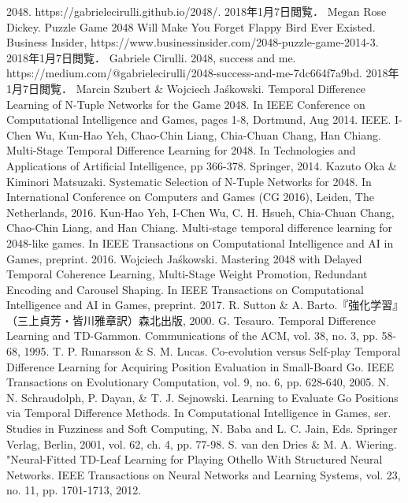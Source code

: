 \documentclass{suribt}
\begin{document}
\begin{thebibliography}{}
  2048. https://gabrielecirulli.github.io/2048/. 2018年1月7日閲覧．
  Megan Rose Dickey. Puzzle Game 2048 Will Make You Forget Flappy Bird Ever Existed. Business Insider, https://www.businessinsider.com/2048-puzzle-game-2014-3. 2018年1月7日閲覧．
  Gabriele Cirulli. 2048, success and me. https://medium.com/@gabrielecirulli/2048-success-and-me-7dc664f7a9bd. 2018年1月7日閲覧．
  Marcin Szubert \& Wojciech Ja\'{s}kowski. Temporal Difference Learning of N-Tuple Networks for the Game 2048. In IEEE Conference on Computational Intelligence and Games, pages 1-8, Dortmund, Aug 2014. IEEE.
  I-Chen Wu, Kun-Hao Yeh, Chao-Chin Liang, Chia-Chuan Chang, Han Chiang. Multi-Stage Temporal Difference Learning for 2048. In Technologies and Applications of Artificial Intelligence, pp 366-378. Springer, 2014.
  Kazuto Oka \& Kiminori Matsuzaki. Systematic Selection of N-Tuple Networks for 2048. In International Conference on Computers and Games (CG 2016), Leiden, The Netherlands, 2016.
  Kun-Hao Yeh, I-Chen Wu, C. H. Hsueh, Chia-Chuan Chang, Chao-Chin Liang, and Han Chiang. Multi-stage temporal difference learning for 2048-like games. In IEEE Transactions on Computational Intelligence and AI in Games, preprint. 2016.
  Wojciech Ja\'{s}kowski. Mastering 2048 with Delayed Temporal Coherence Learning, Multi-Stage Weight Promotion, Redundant Encoding and Carousel Shaping. In IEEE Transactions on Computational Intelligence and AI in Games, preprint. 2017.
  R. Sutton \& A. Barto.『強化学習』（三上貞芳・皆川雅章訳）森北出版, 2000.
  G. Tesauro. Temporal Difference Learning and TD-Gammon. Communications of the ACM, vol. 38, no. 3, pp. 58-68, 1995.
  T. P. Runarsson \& S. M. Lucas. Co-evolution versus Self-play Temporal Difference Learning for Acquiring Position Evaluation in Small-Board Go. IEEE Transactions on Evolutionary Computation, vol. 9, no. 6, pp. 628-640, 2005.
  N. N. Schraudolph, P. Dayan, \& T. J. Sejnowski. Learning to Evaluate Go Positions via Temporal Difference Methods. In Computational Intelligence in Games, ser. Studies in Fuzziness and Soft Computing, N. Baba and L. C. Jain, Eds. Springer Verlag, Berlin, 2001, vol. 62, ch. 4, pp. 77-98.
  S. van den Dries \& M. A. Wiering. "Neural-Fitted TD-Leaf Learning for Playing Othello With Structured Neural Networks. IEEE Transactions on Neural Networks and Learning Systems, vol. 23, no. 11, pp. 1701-1713, 2012.

\end{thebibliography}
\end{document}
